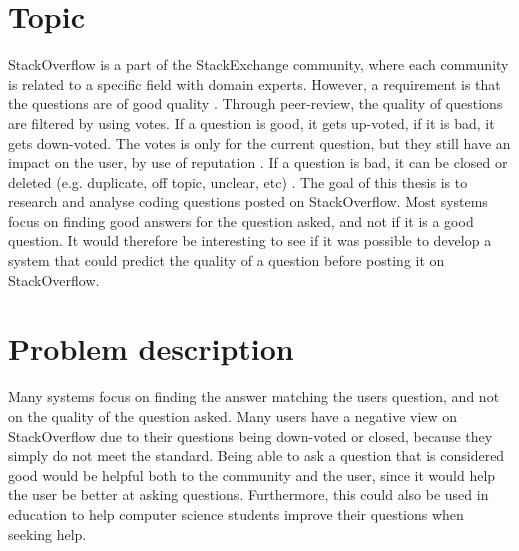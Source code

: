 \label{chap:introduction}

\section{Topic}
\label{sec:topic_covered}
StackOverflow is a part of the StackExchange community, where each community is related to a specific field with 
 domain experts. However, a requirement is that the questions are of good quality \cite{Stackoverflow.com2016c, 
 	 Stackoverflow.com2016d, Stackoverflow.com2016e}. Through peer-review, the quality of questions are filtered 
  by using votes. If a question is good, it gets up-voted, if it is bad, it gets down-voted. The votes is only 
   for the current question, but they still have an impact on the user, by use of reputation 
   \cite{Stackoverflow.com2016b}. If a question is bad, it can be closed or deleted (e.g. duplicate, off topic, 
  unclear, etc) \cite{Stackoverflow.com2016a}. 
\vspace{0.5em}\newline
The goal of this thesis is to research and analyse coding questions posted on StackOverflow. Most systems focus 
on finding good answers for the question asked, and not if it is a good question. It would therefore 
be interesting to see if it was possible to develop a system that could predict the quality of a question before 
posting it on StackOverflow.

\section{Problem description}
\label{sec:problem_description}
Many systems focus on finding the answer matching the users question, and not on the quality of the question 
 asked. Many users have a negative view on StackOverflow due to their questions being down-voted or closed, 
because they simply do not meet the standard. Being able to ask a question that is considered good would be 
 helpful both to the community and the user, since it would help the user be better at asking questions. 
Furthermore, this could also be used in education to help computer science students improve their 
questions when seeking help.


